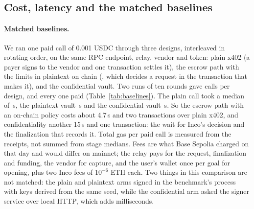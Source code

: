 \subsection{Cost, latency and the matched baselines}
\label{sec:compare}

\paragraph{Matched baselines.} We ran one paid call of 0.001 USDC through three designs, interleaved in rotating order, on the same RPC endpoint, relay,
vendor and token: plain x402 (a payer signs  to the vendor and one transaction settles it), the escrow path with the limits
in plaintext on chain (, which decides a request in the transaction that makes it), and the confidential vault. Two runs of ten
rounds gave \basePlainCalls{} calls per design, and every one paid (Table~\ref{tab:baselines}). The plain call took a median of \basePlainMedian\,s, the
plaintext vault \basePlaintextMedian\,s and the confidential vault \baseConfidentialMedian\,s. So the escrow path with an on-chain policy costs about
4.7\,s and two transactions over plain x402, and confidentiality another 15\,s and one transaction: the wait for Inco's decision and the finalization that
records it. Total gas per paid call is measured from the receipts, not summed from stage medians. Fees are what Base Sepolia charged on that day and
would differ on mainnet; the relay pays for the request, finalization and funding, the vendor for capture, and the user's wallet once per goal for opening,
plus two Inco fees of $10^{-6}$ ETH each. Two things in this comparison are not matched: the plain and plaintext arms signed in the benchmark's process with
keys derived from the same seed, while the confidential arm asked the signer service over local HTTP, which adds milliseconds.

\begin{table}[t]
\centering\small
\resizebox{\linewidth}{!}{}
\caption{Matched baselines on Base Sepolia, 9 November 2026. \baselinesCaption{} Medians and percentiles of end-to-end time over paid
calls; failed and stalled calls are counted, not dropped. Gas and fee (in units of $10^{-9}$ ETH) are per paid call, from receipts, in the run that
recorded every receipt.}
\label{tab:baselines}
\end{table}

